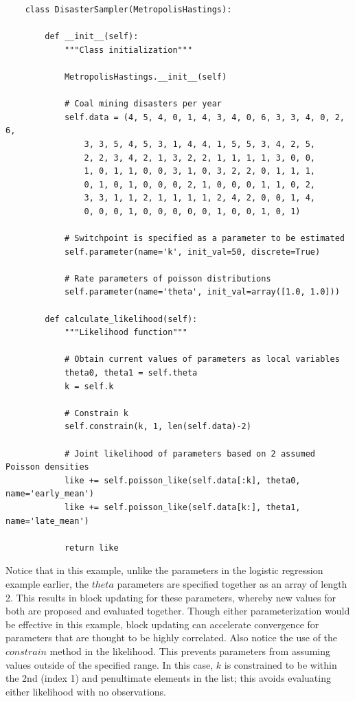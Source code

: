 \documentclass[]{book}
\begin{document}
\begin{verbatim}
	class DisasterSampler(MetropolisHastings):

	    def __init__(self):
	        """Class initialization"""

	        MetropolisHastings.__init__(self)

	        # Coal mining disasters per year
	        self.data = (4, 5, 4, 0, 1, 4, 3, 4, 0, 6, 3, 3, 4, 0, 2, 6,
	            3, 3, 5, 4, 5, 3, 1, 4, 4, 1, 5, 5, 3, 4, 2, 5,
	            2, 2, 3, 4, 2, 1, 3, 2, 2, 1, 1, 1, 1, 3, 0, 0,
	            1, 0, 1, 1, 0, 0, 3, 1, 0, 3, 2, 2, 0, 1, 1, 1,
	            0, 1, 0, 1, 0, 0, 0, 2, 1, 0, 0, 0, 1, 1, 0, 2,
	            3, 3, 1, 1, 2, 1, 1, 1, 1, 2, 4, 2, 0, 0, 1, 4,
	            0, 0, 0, 1, 0, 0, 0, 0, 0, 1, 0, 0, 1, 0, 1)

	        # Switchpoint is specified as a parameter to be estimated
	        self.parameter(name='k', init_val=50, discrete=True)

	        # Rate parameters of poisson distributions
	        self.parameter(name='theta', init_val=array([1.0, 1.0]))

	    def calculate_likelihood(self):
	        """Likelihood function"""

	        # Obtain current values of parameters as local variables
	        theta0, theta1 = self.theta
	        k = self.k

	        # Constrain k
	        self.constrain(k, 1, len(self.data)-2)

	        # Joint likelihood of parameters based on 2 assumed Poisson densities
	        like += self.poisson_like(self.data[:k], theta0, name='early_mean')
	        like += self.poisson_like(self.data[k:], theta1, name='late_mean')

	        return like
\end{verbatim}
Notice that in this example, unlike the parameters in the logistic regression example earlier, the $theta$ parameters are specified together as an array of length 2. This results in block updating for these parameters, whereby new values for both are proposed and evaluated together. Though either parameterization would be effective in this example, block updating can accelerate convergence for parameters that are thought to be highly correlated. Also notice the use of the $constrain$ method in the likelihood. This prevents parameters from assuming values outside of the specified range. In this case, $k$ is constrained to be within the 2nd (index 1) and penultimate elements in the list; this avoids evaluating either likelihood with no observations.
\end{document}
